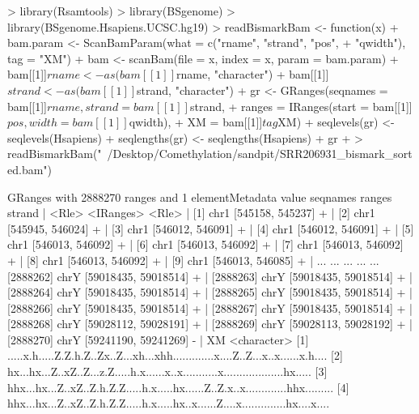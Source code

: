 \documentclass[a4paper]{article}
\begin{document}
\begin{Schunk}
\begin{Sinput}
> library(Rsamtools)
> library(BSgenome)
> library(BSgenome.Hsapiens.UCSC.hg19)
> readBismarkBam <- function(x) {
+     bam.param <- ScanBamParam(what = c("rname", "strand", "pos", 
+         "qwidth"), tag = "XM")
+     bam <- scanBam(file = x, index = x, param = bam.param)
+     bam[[1]]$rname <- as(bam[[1]]$rname, "character")
+     bam[[1]]$strand <- as(bam[[1]]$strand, "character")
+     gr <- GRanges(seqnames = bam[[1]]$rname, strand = bam[[1]]$strand, 
+         ranges = IRanges(start = bam[[1]]$pos, width = bam[[1]]$qwidth), 
+         XM = bam[[1]]$tag$XM)
+     seqlevels(gr) <- seqlevels(Hsapiens)
+     seqlengths(gr) <- seqlengths(Hsapiens)
+     gr
+ }
> readBismarkBam("~/Desktop/Comethylation/sandpit/SRR206931_bismark_sorted.bam")
\end{Sinput}
\begin{Soutput}
GRanges with 2888270 ranges and 1 elementMetadata value
          seqnames               ranges strand   |
             <Rle>            <IRanges>  <Rle>   |
      [1]     chr1     [545158, 545237]      +   |
      [2]     chr1     [545945, 546024]      +   |
      [3]     chr1     [546012, 546091]      +   |
      [4]     chr1     [546012, 546091]      +   |
      [5]     chr1     [546013, 546092]      +   |
      [6]     chr1     [546013, 546092]      +   |
      [7]     chr1     [546013, 546092]      +   |
      [8]     chr1     [546013, 546092]      +   |
      [9]     chr1     [546013, 546085]      +   |
      ...      ...                  ...    ... ...
[2888262]     chrY [59018435, 59018514]      +   |
[2888263]     chrY [59018435, 59018514]      +   |
[2888264]     chrY [59018435, 59018514]      +   |
[2888265]     chrY [59018435, 59018514]      +   |
[2888266]     chrY [59018435, 59018514]      +   |
[2888267]     chrY [59018435, 59018514]      +   |
[2888268]     chrY [59028112, 59028191]      +   |
[2888269]     chrY [59028113, 59028192]      +   |
[2888270]     chrY [59241190, 59241269]      -   |
                                                                                        XM
                                                                               <character>
      [1] .....x.h.....Z.Z.h.Z..Zx..Z...xh...xhh.............x....Z..Z...x..x......x.h....
      [2] hx...hx...Z..xZ..Z...z.Z.....h.x......x..x...........x...................hx.....
      [3] hhx...hx...Z..xZ..Z.h.Z.Z.....h.x.....hx......Z..Z.x..x.............hhx.........
      [4] hhx...hx...Z..xZ..Z.h.Z.Z.....h.x.....hx..x......Z....x..............hx....x....

\end{Soutput}
\end{Schunk}
\end{document}
